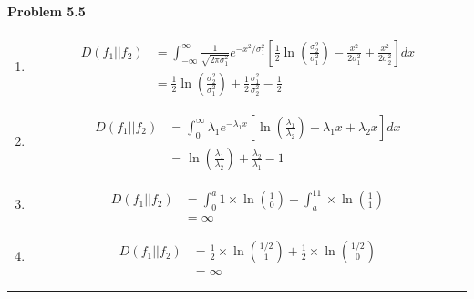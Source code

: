 \documentclass[12pt, letterpaper]{scrartcl}
\begin{document}
\paragraph*{Problem 5.5} \hfill\newline
\begin{enumerate}[((a))]
    \item
    \begin{align*}
        D(f_1||f_2)&=\int_{-\infty}^\infty\frac{1}{\sqrt{2\pi\sigma_1^2}} e^{-x^2/\sigma_1^2}[\frac{1}{2}\ln(\frac{\sigma_2^2}{\sigma_1^2})-\frac{x^2}{2\sigma_1^2}+\frac{x^2}{2\sigma_2^2}]dx\\
        &=\frac{1}{2}\ln(\frac{\sigma_2^2}{\sigma_1^2})+\frac{1}{2}\frac{\sigma_1^2}{\sigma_2^2}-\frac{1}{2}
    \end{align*}
    \item
    \begin{align*}
        D(f_1||f_2)&=\int_0^\infty\lambda_1 e^{-\lambda_1 x}[\ln(\frac{\lambda_1}{\lambda_2})-\lambda_1x+\lambda_2x]dx\\
        &=\ln(\frac{\lambda_1}{\lambda_2})+\frac{\lambda_2}{\lambda_1}-1
    \end{align*}
    \item 
    \begin{align*}
        D(f_1||f_2)&=\int_0^a1\times\ln(\frac{1}{0})+\int_a^11\times\ln(\frac{1}{1})\\
        &=\infty
    \end{align*}
    \item 
    \begin{align*}
        D(f_1||f_2)&=\frac{1}{2}\times\ln(\frac{1/2}{1})+\frac{1}{2}\times\ln(\frac{1/2}{0})\\
        &=\infty
    \end{align*}
\end{enumerate}
\hrule
\end{document}
